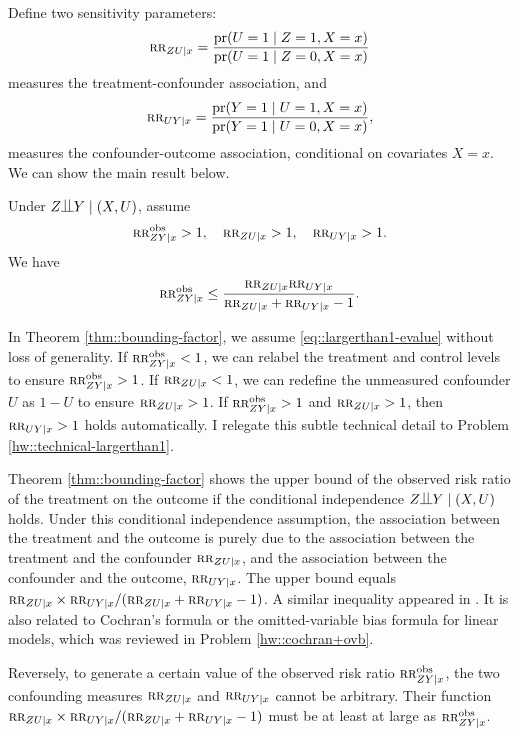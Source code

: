 Define two sensitivity parameters:
$$
\textsc{rr}_{ZU\mid x} = \frac{ \textup{pr}(U=1\mid Z=1,X=x) }{ \textup{pr}(U=1\mid Z=0,X=x)  } 
$$
measures the treatment-confounder association, 
and
$$
\textsc{rr}_{UY\mid x} = \frac{  \textup{pr}(Y=1\mid U=1, X=x) }{  \textup{pr}(Y=1\mid U=0, X=x) },
$$
measures the confounder-outcome association, conditional on covariates $X=x$.  We can show the main result below.

\begin{theorem}\label{thm::bounding-factor}
Under $Z\ind Y\mid (X, U)$, assume 
\begin{equation}\label{eq::largerthan1-evalue}
\RR_{ZY\mid x}^\obs > 1, \quad
 \RR_{ZU\mid x} > 1,\quad 
 \RR_{UY\mid x} > 1.
\end{equation}
We have 
$$
\textsc{rr}_{ZY\mid x}^{\textup{obs}} \leq \frac{ \textsc{rr}_{ZU\mid x}  \textsc{rr}_{UY\mid x} }{  \textsc{rr}_{ZU\mid x} + \textsc{rr}_{UY\mid x} - 1} .
$$
\end{theorem}

In Theorem \ref{thm::bounding-factor}, we assume \eqref{eq::largerthan1-evalue}  without loss of generality. If $\textsc{rr}_{ZY\mid x}^{\textup{obs}} < 1$, we can relabel the treatment and control levels to ensure $\textsc{rr}_{ZY\mid x}^{\textup{obs}} > 1$. If $  \textsc{rr}_{ZU\mid x}  < 1$, we can redefine the unmeasured confounder $U$ as $1-U$ to ensure $   \textsc{rr}_{ZU\mid x}  > 1$. If $\textsc{rr}_{ZY\mid x}^{\textup{obs}} > 1$ and $ \textsc{rr}_{ZU\mid x} > 1$, then $ \textsc{rr}_{UY\mid x}  > 1$ holds automatically. I relegate this subtle technical detail to Problem \ref{hw::technical-largerthan1}. 


Theorem \ref{thm::bounding-factor} shows the upper bound of the observed risk ratio of the treatment on the outcome if the conditional independence $Z\ind Y\mid (X, U)$ holds. Under this conditional independence assumption, the association between the treatment and the outcome is purely due to the association between the treatment and the confounder $\textsc{rr}_{ZU\mid x} $, and the association between the confounder and the outcome, $\textsc{rr}_{UY\mid x}$. The upper bound equals $\textsc{rr}_{ZU\mid x} \times  \textsc{rr}_{UY\mid x} /  (\textsc{rr}_{ZU\mid x} + \textsc{rr}_{UY\mid x} - 1)$. 
A similar inequality appeared in \citet{lee2011bounding}. 
It is also related to Cochran's formula or the omitted-variable bias formula for linear models, which was reviewed in Problem \ref{hw::cochran+ovb}.  



Reversely, to generate a certain value of the observed risk ratio $\textsc{rr}_{ZY\mid x}^{\textup{obs}}$, the two confounding measures $\textsc{rr}_{ZU\mid x} $ and $\textsc{rr}_{UY\mid x}$ cannot be arbitrary. Their function $\textsc{rr}_{ZU\mid x}  \times  \textsc{rr}_{UY\mid x} /  (\textsc{rr}_{ZU\mid x} + \textsc{rr}_{UY\mid x} - 1)$ must be at least at large as $\textsc{rr}_{ZY\mid x}^{\textup{obs}}$. 

